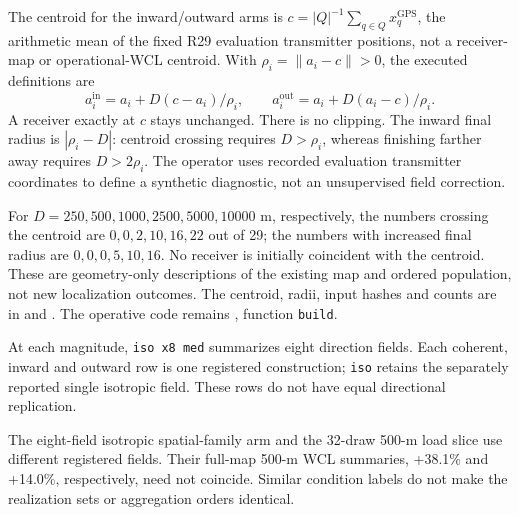 \documentclass[journal,onecolumn,10pt]{IEEEtran}
\begin{document}
The centroid for the inward/outward arms is $c=|Q|^{-1}\sum_{q\in Q}x_q^{\mathrm{GPS}}$, the arithmetic mean of the fixed R29 evaluation transmitter positions, not a receiver-map or operational-WCL centroid. With $\rho_i=\|a_i-c\|>0$, the executed definitions are
\[
 a_i^{\mathrm{in}}=a_i+D(c-a_i)/\rho_i,\qquad a_i^{\mathrm{out}}=a_i+D(a_i-c)/\rho_i.
\]
A receiver exactly at $c$ stays unchanged. There is no clipping. The inward final radius is $|\rho_i-D|$: centroid crossing requires $D>\rho_i$, whereas finishing farther away requires $D>2\rho_i$. The operator uses recorded evaluation transmitter coordinates to define a synthetic diagnostic, not an unsupervised field correction.

For $D=250,500,1000,2500,5000,10000$ m, respectively, the numbers crossing the centroid are $0,0,2,10,16,22$ out of 29; the numbers with increased final radius are $0,0,0,5,10,16$. No receiver is initially coincident with the centroid. These are geometry-only descriptions of the existing map and ordered population, not new localization outcomes. The centroid, radii, input hashes and counts are in  and . The operative code remains , function \texttt{build}.

At each magnitude, \texttt{iso x8 med} summarizes eight direction fields. Each coherent, inward and outward row is one registered construction; \texttt{iso} retains the separately reported single isotropic field. These rows do not have equal directional replication.


The eight-field isotropic spatial-family arm and the 32-draw 500-m load slice use different registered fields. Their full-map 500-m WCL summaries, +38.1\% and +14.0\%, respectively, need not coincide. Similar condition labels do not make the realization sets or aggregation orders identical.
\end{document}
